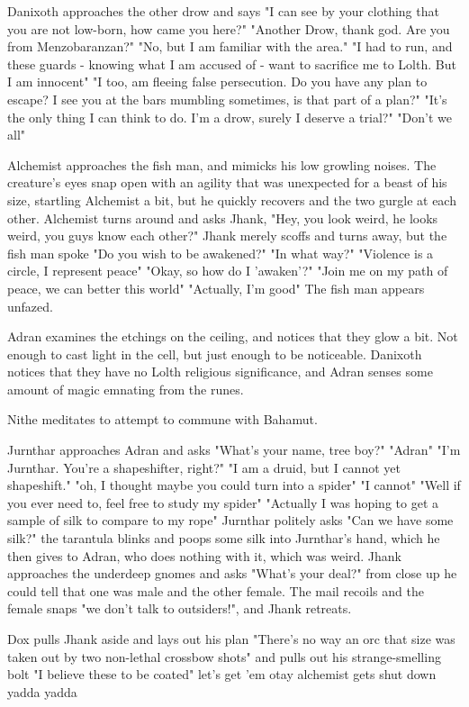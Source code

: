 \documentclass[letterpaper,10pt,twoside,twocolumn,openany]{book}
\begin{document}
Danixoth approaches the other drow and says "I can see by your clothing that you are not low-born, how came you here?"
"Another Drow, thank god. Are you from Menzobaranzan?"
"No, but I am familiar with the area."
"I had to run, and these guards - knowing what I am accused of - want to sacrifice me to Lolth. But I am innocent"
"I too, am fleeing false persecution. Do you have any plan to escape? I see you at the bars mumbling sometimes, is that part of a plan?"
"It's the only thing I can think to do. I'm a drow, surely I deserve a trial?"
"Don't we all"

Alchemist approaches the fish man, and mimicks his low growling noises. The creature's eyes snap open with an agility that was unexpected for a beast of his size, startling Alchemist a bit, but he quickly recovers and the two gurgle at each other. Alchemist turns around and asks Jhank, "Hey, you look weird, he looks weird, you guys know each other?" Jhank merely scoffs and turns away, but the fish man spoke "Do you wish to be awakened?"
"In what way?"
"Violence is a circle, I represent peace"
"Okay, so how do I 'awaken'?"
"Join me on my path of peace, we can better this world"
"Actually, I'm good"
The fish man appears unfazed.

Adran examines the etchings on the ceiling, and notices that they glow a bit. Not enough to cast light in the cell, but just enough to be noticeable. Danixoth notices that they have no Lolth religious significance, and Adran senses some amount of magic emnating from the runes. 

Nithe meditates to attempt to commune with Bahamut.

Jurnthar approaches Adran and asks "What's your name, tree boy?" "Adran" "I'm Jurnthar. You're a shapeshifter, right?" "I am a druid, but I cannot yet shapeshift." "oh, I thought maybe you could turn into a spider" "I cannot" "Well if you ever need to, feel free to study my spider" "Actually I was hoping to get a sample of silk to compare to my rope" Jurnthar politely asks "Can we have some silk?" the tarantula blinks and poops some silk into Jurnthar's hand, which he then gives to Adran, who does nothing with it, which was weird. Jhank approaches the underdeep gnomes and asks "What's your deal?" from close up he could tell that one was male and the other female. The mail recoils and the female snaps "we don't talk to outsiders!", and Jhank retreats.

Dox pulls Jhank aside and lays out his plan "There's no way an orc that size was taken out by two non-lethal crossbow shots" and pulls out his strange-smelling bolt "I believe these to be coated" let's get 'em otay alchemist gets shut down yadda yadda
\end{document}
